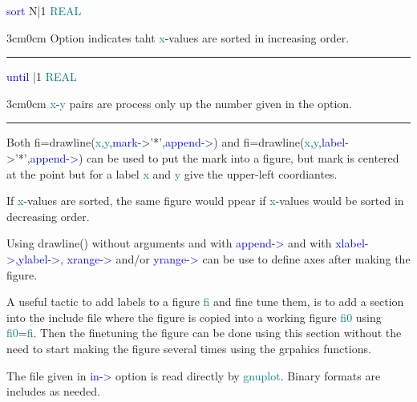 \noindent \textcolor{blue}{sort} \tabto{3cm} N|1 \tabto{5cm}  \textcolor{teal}{REAL} \tabto{7cm} 
\begin{changemargin}{3cm}{0cm} 
\noindent  Option indicates taht \textcolor{teal}{x}-values are sorted in increasing order. 
\end{changemargin} 
\vspace{0.3cm} 
\hrule 
\vspace{0.3cm} 
\noindent \textcolor{blue}{until} \tabto{3cm} |1 \tabto{5cm}  \textcolor{teal}{REAL} \tabto{7cm} 
\begin{changemargin}{3cm}{0cm} 
\noindent  \textcolor{teal}{x}-\textcolor{teal}{y} pairs are process only up the number given in the option. 
\end {changemargin} 
\hrule 
\vspace{0.2cm} 
\begin{note} 
Both  fi=\textcolor{VioletRed}{drawline}(\textcolor{teal}{x},\textcolor{teal}{y},\textcolor{blue}{mark->}'*',\textcolor{blue}{append->}) and fi=\textcolor{VioletRed}{drawline}(\textcolor{teal}{x},\textcolor{teal}{y},\textcolor{blue}{label->}'*',\textcolor{blue}{append->}) can 
be used to put the mark into a figure, but mark is centered at the point but 
for a label \textcolor{teal}{x} and \textcolor{teal}{y} give the upper-left coordiantes. 
\end{note} 
\begin{note} 
If \textcolor{teal}{x}-values are sorted, the same figure would ppear if \textcolor{teal}{x}-values would be sorted in decreasing order. 
\end{note} 
\begin{note} 
Using \textcolor{VioletRed}{drawline}() without arguments and with \textcolor{blue}{append->} and with \textcolor{blue}{xlabel->},\textcolor{blue}{ylabel->}, 
\textcolor{blue}{xrange->} and/or \textcolor{blue}{yrange->} 
can be use to define axes after making the figure. 
\end{note} 
\begin{note} 
A useful tactic to add labels to a figure \textcolor{teal}{fi} and fine tune them, is to 
add	a section into the include file where the figure is copied into a working figure \textcolor{teal}{fi0} 
using \textcolor{teal}{fi0}=\textcolor{teal}{fi}. Then the finetuning the figure can be done using this section 
without the need to start making the figure several times using the grpahics functions. 
\end{note} 
\begin{note} 
The file given in \textcolor{blue}{in->} option is read directly by \textcolor{teal}{gnuplot}. Binary formats are includes as needed. 
\end{note} 
